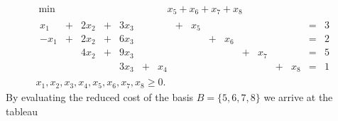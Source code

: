 \begin{displaymath}
  \begin{array}{l}
     \min   \quad \quad \quad \quad\quad \quad \quad \quad\quad  \quad \quad  x_5+x_6+x_7+x_8\\
  \begin{array}{ccccccccccccccccc}   
   x_1&+&2x_2&+&3x_3&&&+ &x_5&&&&&&&=&3\\ 
   -x_1&+&2x_2&+&6x_3&&&&&+&x_6&&&&&=&2\\ 
   &&4x_2&+&9x_3&&&&&&&+&x_7&&&=&5\\ 
   &&&&3x_3&+&x_4&&&&&&&+&x_8&=&1 
  \end{array}\\
  x_1,x_2,x_3,x_4,x_5,x_6,x_7,x_8\geq0.
\end{array}
\end{displaymath}
%
By evaluating the reduced cost of the basis $B = \{5,6,7,8\}$ we
arrive at the tableau 





